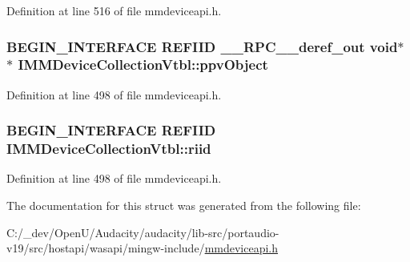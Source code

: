 Definition at line 516 of file mmdeviceapi.\+h.

\subsubsection[{\texorpdfstring{ppv\+Object}{ppvObject}}]{\setlength{\rightskip}{0pt plus 5cm}B\+E\+G\+I\+N\+\_\+\+I\+N\+T\+E\+R\+F\+A\+CE {\bf R\+E\+F\+I\+ID} {\bf \+\_\+\+\_\+\+R\+P\+C\+\_\+\+\_\+deref\+\_\+out} {\bf void}$\ast$$\ast$ I\+M\+M\+Device\+Collection\+Vtbl\+::ppv\+Object}\hypertarget{struct_i_m_m_device_collection_vtbl_af22a0c04f1ca95c91ae72b01aba017fa}{}\label{struct_i_m_m_device_collection_vtbl_af22a0c04f1ca95c91ae72b01aba017fa}


Definition at line 498 of file mmdeviceapi.\+h.

\subsubsection[{\texorpdfstring{riid}{riid}}]{\setlength{\rightskip}{0pt plus 5cm}B\+E\+G\+I\+N\+\_\+\+I\+N\+T\+E\+R\+F\+A\+CE {\bf R\+E\+F\+I\+ID} I\+M\+M\+Device\+Collection\+Vtbl\+::riid}\hypertarget{struct_i_m_m_device_collection_vtbl_a424e4f5299e4e25e5ded2132fc0451fe}{}\label{struct_i_m_m_device_collection_vtbl_a424e4f5299e4e25e5ded2132fc0451fe}


Definition at line 498 of file mmdeviceapi.\+h.



The documentation for this struct was generated from the following file\+:\begin{DoxyCompactItemize}
\item 
C\+:/\+\_\+dev/\+Open\+U/\+Audacity/audacity/lib-\/src/portaudio-\/v19/src/hostapi/wasapi/mingw-\/include/\hyperlink{mmdeviceapi_8h}{mmdeviceapi.\+h}\end{DoxyCompactItemize}
